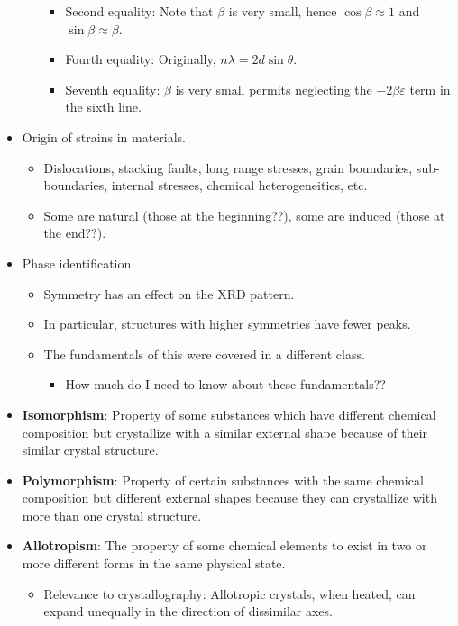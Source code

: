 \documentclass[../notes.tex]{subfiles}
\begin{document}
\begin{itemize}
\begin{itemize}
\begin{itemize}
            \item Second equality: Note that $\beta$ is very small, hence $\cos\beta\approx 1$ and $\sin\beta\approx\beta$.
            \item Fourth equality: Originally, $n\lambda=2d\sin\theta$.
            \item Seventh equality: $\beta$ is very small permits neglecting the $-2\beta\varepsilon$ term in the sixth line.
        \end{itemize}
    \end{itemize}
    \item Origin of strains in materials.
    \begin{itemize}
        \item Dislocations, stacking faults, long range stresses, grain boundaries, sub-boundaries, internal stresses, chemical heterogeneities, etc.
        \item Some are natural (those at the beginning??), some are induced (those at the end??).
    \end{itemize}
    \item Phase identification.
    \begin{itemize}
        \item Symmetry has an effect on the XRD pattern.
        \item In particular, structures with higher symmetries have fewer peaks.
        \item The fundamentals of this were covered in a different class.
        \begin{itemize}
            \item How much do I need to know about these fundamentals??
        \end{itemize}
    \end{itemize}
    \item \textbf{Isomorphism}: Property of some substances which have different chemical composition but crystallize with a similar external shape because of their similar crystal structure.
    \item \textbf{Polymorphism}: Property of certain substances with the same chemical composition but different external shapes because they can crystallize with more than one crystal structure.
    \item \textbf{Allotropism}: The property of some chemical elements to exist in two or more different forms in the same physical state.
    \begin{itemize}
        \item Relevance to crystallography: Allotropic crystals, when heated, can expand unequally in the direction of dissimilar axes.

\end{itemize}
\end{itemize}
\end{document}
